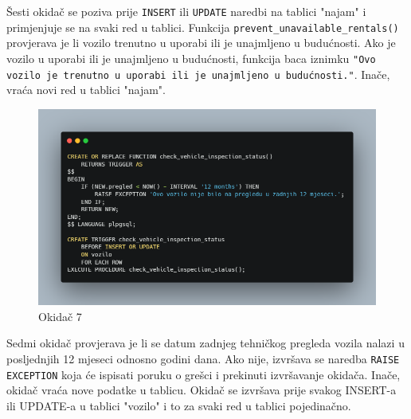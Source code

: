 \documentclass[]{foi}
\begin{document}
Šesti okidač se poziva prije \texttt{INSERT} ili \texttt{UPDATE} naredbi na tablici "najam" i primjenjuje se na svaki red u tablici. Funkcija \texttt{prevent\_unavailable\_rentals()} provjerava je li vozilo trenutno u uporabi ili je unajmljeno u budućnosti. Ako je vozilo u uporabi ili je unajmljeno u budućnosti, funkcija baca iznimku \texttt{"Ovo vozilo je trenutno u uporabi ili je unajmljeno u budućnosti."}. Inače, vraća novi red u tablici "najam".
\newpage

\begin{figure}[!ht]
    \centering
    \includegraphics[width=1\textwidth]{slike/7.png}
    \caption{Okidač 7}
    \label{fig:sedmi}
\end{figure}

Sedmi okidač provjerava je li se datum zadnjeg tehničkog pregleda vozila nalazi u posljednjih 12 mjeseci odnosno godini dana. Ako nije, izvršava se naredba \texttt{RAISE EXCEPTION} koja će ispisati poruku o grešci i prekinuti izvršavanje okidača. Inače, okidač vraća nove podatke u tablicu. Okidač se izvršava prije svakog INSERT-a ili UPDATE-a u tablici "vozilo" i to za svaki red u tablici pojedinačno.
\newpage
\end{document}
